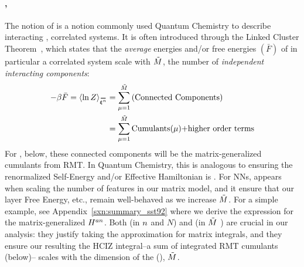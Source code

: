 \paragraph{\SizeConsistency,}  
The notion of \emph{\SizeConsistency} is a notion commonly 
used Quantum Chemistry to describe interacting , correlated systems. It is often introduced through the Linked Cluster Theorem~\cite{Hubbard1959,Brandow1963},
which states that the \emph{average} energies and/or free energies $(\bar{F})$ of in particular a correlated system scale with $\tilde{M}$,
the number of \emph{independent interacting components}:
\begin{align}
  \label{eqn:LCT}
  -\beta \bar{F}=\langle \ln Z \rangle_{\AVGNDXIn} &= \sum_{\mu=1}^{\MECS}\text{(Connected Components)} \\ \nonumber
  &= \sum_{\mu=1}^{\MECS}\text{Cumulants($\mu$)+higher order terms} 
\end{align}
For \SETOL, below, these connected components will be the matrix-generalized cumulants from RMT.
In Quantum Chemistry, this is analogous to ensuring the renormalized Self-Energy and/or Effective Hamiltonian is \SizeConsistent.
For NNs, \SizeConsistency appears when scaling the number of features in our matrix model,
and it ensure that our layer Free Energy, etc.,  remain well-behaved as we increase $\tilde{M}$.
For a simple example, see Appendix~\ref{sxn:summary_sst92}
 where we derive the expression for the matrix-generalized
\AnnealedHamiltonian $H^{an}$.  
Both \SizeExtensivity (in $n$ and $N$) and \SizeConsistency (in $\tilde{M}$ )
are crucial in our \SETOL analysis:  they justify taking the \LargeN approximation for matrix integrals, and they ensure
our resulting the HCIZ integral--a sum of integrated RMT cumulants (below)--
scales with the dimension of the \EffectiveCorrelationSpace (\ECS), $\tilde{M}$.  


